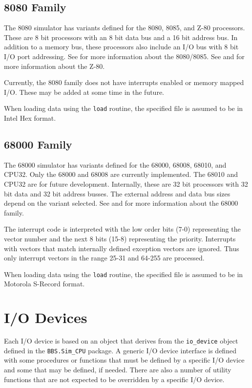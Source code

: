 \documentclass[10pt, openany]{book}
\newcommand{\package}[1]{\texttt{#1}}
\newcommand{\function}[1]{\texttt{#1}}
\newcommand{\datatype}[1]{\texttt{#1}}
\begin{document}
\section{8080 Family}
The 8080 simulator has variants defined for the 8080, 8085, and Z-80 processors.  These are 8 bit processors with an 8 bit data bus and a 16 bit address bus.  In addition to a memory bus, these processors also include an I/O bus with 8 bit I/O port addressing.  See \cite{i8080} for more information about the 8080/8085.  See \cite{z80} and \cite{z80undoc} for more information about the Z-80.

Currently, the 8080 family does not have interrupts enabled or memory mapped I/O.  These may be added at some time in the future.

When loading data using the \function{load} routine, the specified file is assumed to be in Intel Hex format.

\section{68000 Family}
The 68000 simulator has variants defined for the 68000, 68008, 68010, and CPU32.  Only the 68000 and 68008 are currently implemented.  The 68010 and CPU32 are for future development.  Internally, these are 32 bit processors with 32 bit data and 32 bit address busses.  The external address and data bus sizes depend on the variant selected.  See \cite{m68000a} and \cite{m68000b} for more information about the 68000 family.

The interrupt code is interpreted with the low order bits (7-0) representing the vector number and the next 8 bits (15-8) representing the priority.  Interrupts with vectors that match internally defined exception vectors are ignored.  Thus only interrupt vectors in the range 25-31 and 64-255 are processed.

When loading data using the \function{load} routine, the specified file is assumed to be in Motorola S-Record format.

\chapter{I/O Devices}
\label{chap:IODev}
Each I/O device is based on an object that derives from the \datatype{io\_device} object defined in the \package{BBS.Sim\_CPU} package.  A generic I/O device interface is defined with some procedures or functions that must be defined by a specific I/O device and some that may be defined, if needed.  There are also a number of utility functions that are not expected to be overridden by a specific I/O device.
\end{document}
